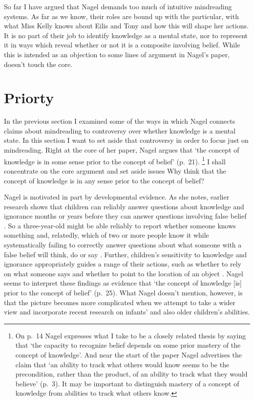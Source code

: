 \documentclass[11pt,a4paper]{extarticle}
\begin{document}
So far I have argued that Nagel demands too much of intuitive mindreading systems.
As far as we know, their roles are bound up with the particular, with what Miss Kelly knows about Eilis and Tony and how this will shape her actions.
It is no part of their job to identify knowledge as a mental state,
nor to represent it in ways which reveal whether or not it is a composite involving belief.
While this is intended as an objection to some lines of argument in Nagel's paper, doesn't touch the core.




\section{Priorty}
In the previous section I examined some of the ways in which Nagel connects claims about mindreading to controversy over whether knowledge is a mental state.
In this section I want to set aside that controversy in order to focus just on mindreading.
Right at the core of her paper, Nagel argues that  `the concept of knowledge is in some sense prior to the concept of belief' (p.\ 21).%
\footnote{
On p.\ 14  Nagel expresses what I take to be a closely related thesis by saying that `the capacity to recognize belief depends on some prior mastery of the concept of knowledge'.
And near the start of the paper Nagel advertises the claim that `an ability to track what others would know seems to be the precondition, rather than the product, of an ability to track what they would believe' (p.\ 3).
It may be important to distinguish mastery of a concept of knowledge from abilities to track what others know.
}
I shall concentrate on the core argument and set aside issues Why think that the concept of knowledge is in any sense prior to the concept of belief?

Nagel is motivated in part by developmental evidence.
As she notes, earlier research shows that
children can reliably answer questions about knowledge and ignorance months or years before they can answer questions involving false belief \citep{hogrefe_ignorance_1986}.
So a three-year-old might be able reliably to report whether someone knows something and, relatedly, which of two or more people know it while systematically failing to correctly answer questions about what someone with a false belief will think, do or say \citep{Wellman:2001lz}.
Further, children's sensitivity to knowledge and ignorance appropriately guides a range of their actions, such as whether to rely on what someone says \citep{Robinson:1999sq,Robinson:2003bh} and whether to point to the location of an object \citep{Dunham:2000tv,Liszkowski:2008al}.
Nagel seems to interpret these findings as evidence that `the concept of knowledge [is] prior to the concept of belief' (p.\ 25). 
What Nagel doesn't mention, however, is that the picture becomes more complicated when we attempt to take a wider view and incorporate  recent research on infants' and also older children's abilities.
\end{document}
